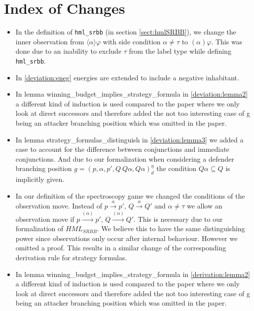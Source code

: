 \section{Index of Changes}
\begin{itemize}
  \item In the definition of \texttt{hml\_srbb} (in section \ref{sect:hmlSRBB}), we change the inner observation from
  $\langle\alpha\rangle\varphi$ with side condition $\alpha \neq \tau$ to $(\alpha)\varphi$.
  This was done due to an inability to exclude $\tau$ from the label type while defining \texttt{hml\_srbb}. 
  
  \item In \ref{deviation:eneg} energies are extended to include a negative inhabitant. 
  
  \item  In lemma winning\_budget\_implies\_strategy\_formula in \ref{deviation:lemma2} a different kind of induction is used compared to the paper 
  where we only look at direct successors and therefore added the not too interesting case of g being an 
  attacker branching position which was omitted in the paper.
  
  \item In lemma strategy\_formulas\_distinguish in  \ref{deviation:lemma3} we added a case to account for the difference between 
  conjunctions and immediate conjunctions. And due to our formalization when considering a
  defender branching position $g=(p,\alpha ,p', Q \ Q\alpha, Q\alpha)_d^\eta$ the condition 
  $Q \alpha \subseteq Q$ is implicitly given.
  
  \item In our definition of the spectroscopy game we changed the conditions of the observation move. 
  Instead of $p \overset{\alpha}{\longrightarrow}p'$, $Q \overset{\alpha}{\longrightarrow} Q'$ and $\alpha \neq \tau$
  we allow an observation move if  $p \overset{(\alpha)}{\longrightarrow}p'$, $Q \overset{(\alpha)}{\longrightarrow} Q'$.
  This is necessary due to our formalization of $HML_{SRBB}$. We believe this to have the same distinguishing power 
  since observations only occur after internal behaviour. However we omitted a proof. 
  This results in a similar change of the corresponding derivation rule for strategy formulas.
  
  \item In lemma winning\_budget\_implies\_strategy\_formula in \ref{derivation:lemma2} a different kind of induction is used compared to the paper 
  where we only look at direct successors and therefore added the not too interesting case of g being an 
  attacker branching position which was omitted in the paper.
  

\end{itemize}
